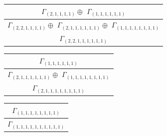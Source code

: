\documentclass[main.tex]{subfiles}
\begin{document}
\bigskip
\begin{minipage}{.5\textwidth}
\centering
\begin{tabular}{c}
$\Gamma_{(
2 , 
1 , 
1 , 
1 , 
1
)} \oplus$
$\Gamma_{(
1 , 
1 , 
1 , 
1 , 
1 , 
1
)}$
\\ \hline
$\Gamma_{(
2 , 
2 , 
1 , 
1 , 
1 , 
1
)} \oplus$
$\Gamma_{(
2 , 
1 , 
1 , 
1 , 
1 , 
1 , 
1
)} \oplus$
$\Gamma_{(
1 , 
1 , 
1 , 
1 , 
1 , 
1 , 
1 , 
1
)}$
\\ \hline
$\Gamma_{(
2 , 
2 , 
1 , 
1 , 
1 , 
1 , 
1 , 
1
)}$
\\
\end{tabular}\end{minipage}
\begin{minipage}{.3\textwidth}
\centering
\begin{tabular}{c}
$\Gamma_{(
1 , 
1 , 
1 , 
1 , 
1 , 
1
)}$
\\ \hline
$\Gamma_{(
2 , 
1 , 
1 , 
1 , 
1 , 
1 , 
1
)} \oplus$
$\Gamma_{(
1 , 
1 , 
1 , 
1 , 
1 , 
1 , 
1 , 
1
)}$
\\ \hline
$\Gamma_{(
2 , 
1 , 
1 , 
1 , 
1 , 
1 , 
1 , 
1 , 
1
)}$
\\
\end{tabular}\end{minipage}
\begin{minipage}{.25\textwidth}
\centering
\begin{tabular}{c}
$\Gamma_{(
1 , 
1 , 
1 , 
1 , 
1 , 
1 , 
1 , 
1
)}$
\\ \hline
$\Gamma_{(
1 , 
1 , 
1 , 
1 , 
1 , 
1 , 
1 , 
1 , 
1 , 
1
)}$
\\
\end{tabular}\end{minipage}
\end{document}
